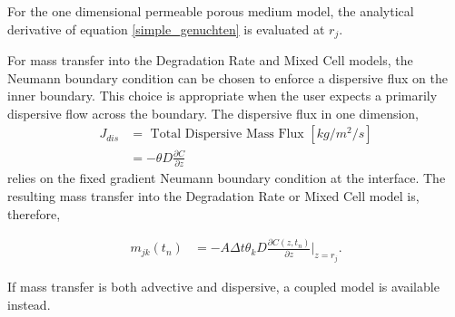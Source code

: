 For the one dimensional permeable porous medium model, the analytical
derivative of equation \eqref{simple_genuchten} is evaluated at $r_j$.


For mass transfer into the Degradation Rate and Mixed Cell models, the Neumann
boundary condition can be chosen to enforce a dispersive flux on the inner
boundary. This choice is appropriate when the user expects a primarily
dispersive flow across the boundary. The dispersive flux in one dimension,
\begin{align}
      J_{dis} &= \mbox{ Total Dispersive Mass Flux }[kg/m^2/s]\nonumber\\
      &= -\theta D\frac{\partial C}{\partial z} \nonumber
\end{align}
relies on the fixed gradient Neumann boundary condition at the interface.
The resulting mass transfer into the Degradation Rate or Mixed Cell model is,
therefore,

\begin{align}
m_{jk}(t_n) &= - A\Delta t \theta_k D \frac{\partial C(z,t_n)}{\partial z}|_{z=r_j}.
\end{align}

If mass transfer is both advective and dispersive, a coupled model is
available instead.
